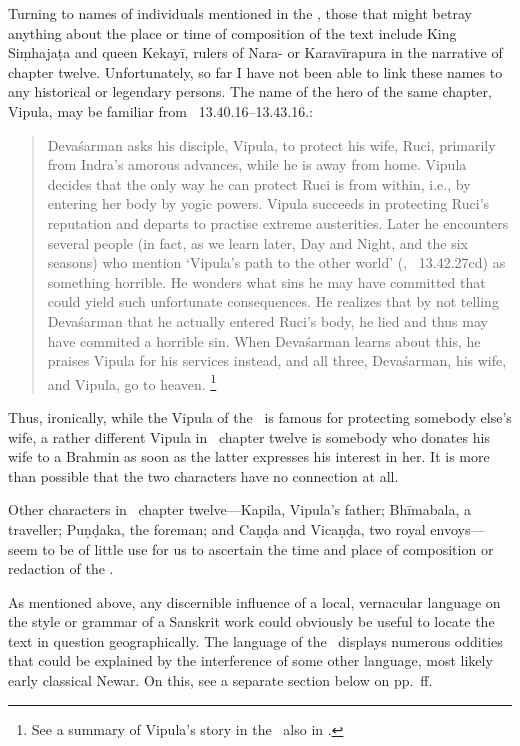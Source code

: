 Turning to names of individuals mentioned in the \VSS,
those that might betray anything about the place or
time of composition of the text include King Siṃhajaṭa
and queen Kekayī, rulers of Nara- or Karavīrapura
in the narrative of chapter twelve. Unfortunately,
so far I have not been able to link these names to
any historical or legendary persons. The name of the
hero of the same chapter, Vipula, may be familiar 
from \MBH\ 13.40.16--13.43.16.: 

\begin{quote}
Devaśarman asks his disciple,
Vipula, to protect his wife, Ruci, primarily from Indra's
amorous advances, while he is away from home.
Vipula decides that the only way he can protect Ruci
is from within, i.e., by entering her body by yogic powers.
Vipula succeeds in protecting Ruci's reputation and 
departs to practise extreme austerities. Later he 
encounters several people (in fact,
as we learn later, Day and Night,
and the six seasons) who mention `Vipula's path to
the other world' (, 
\MBH\ 13.42.27cd) as something horrible. He 
wonders what sins he may have committed that
could yield such unfortunate consequences. He
realizes that by not telling Devaśarman that he
actually entered Ruci's body, he lied and thus
may have commited a horrible sin. When Devaśarman learns
about this, he praises Vipula for his services instead, 
and all three, Devaśarman, his wife, and Vipula,
go to heaven.%
		\footnote{See a summary of Vipula's story in the 
			\MBH\ also in 
			.}
\end{quote}

\noindent
Thus, ironically, while the Vipula of the \MBH\ is famous
for protecting somebody else's wife,  
a rather different Vipula
in \VSS\ chapter twelve is somebody who donates
his wife to a Brahmin as soon as the latter expresses
his interest in her. It is more than possible that
the two characters have no connection at all.

Other characters in \VSS\ chapter twelve---Kapila, 
Vipula's father;
Bhīmabala, a traveller; Puṇḍaka, the foreman; 
and Caṇḍa and Vicaṇḍa, two royal envoys---seem 
to be of little use for us to ascertain the time and place of composition or redaction of the \VSS. 

As mentioned above, any discernible influence
of a local, vernacular language on the style or grammar of
a Sanskrit work could obviously be useful to 
locate the text in question geographically. 
The language of the \VSS\
displays numerous oddities that could be
explained by the interference of some other 
language, most likely early classical Newar.
On this, see a separate section below on 
pp.~\pageref{newar}\thinspace ff.

